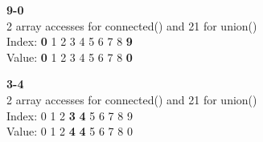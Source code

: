 \documentclass{article}
\begin{document}
\textbf{9-0}\\
2 array accesses for connected() and 21 for union()\\
Index: \hspace{4pt}\textbf{0} \hspace{4pt}1 \hspace{4pt}2 \hspace{4pt}3 \hspace{4pt}4 \hspace{4pt}5 \hspace{4pt}6 \hspace{4pt}7 \hspace{4pt}8 \hspace{4pt}\textbf{9}\\
Value: \hspace{4pt}\textbf{0} \hspace{4pt}1 \hspace{4pt}2 \hspace{4pt}3 \hspace{4pt}4 \hspace{4pt}5 \hspace{4pt}6 \hspace{4pt}7 \hspace{4pt}8 \hspace{4pt}\textbf{0}

\textbf{3-4}\\
2 array accesses for connected() and 21 for union()\\
Index: \hspace{4pt}0 \hspace{4pt}1 \hspace{4pt}2 \hspace{4pt}\textbf{3} \hspace{4pt}\textbf{4} \hspace{4pt}5 \hspace{4pt}6 \hspace{4pt}7 \hspace{4pt}8 \hspace{4pt}9\\
Value: \hspace{4pt}0 \hspace{4pt}1 \hspace{4pt}2 \hspace{4pt}\textbf{4} \hspace{4pt}\textbf{4} \hspace{4pt}5 \hspace{4pt}6 \hspace{4pt}7 \hspace{4pt}8 \hspace{4pt}0
\end{document}
